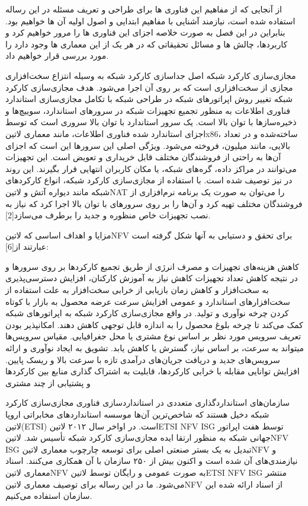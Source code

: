 \documentclass{book}
\begin{document}
از آنجایی که از مفاهیم این فناوری ها برای طراحی و تعریف مسئله در این رساله استفاده شده است، نیازمند آشنایی با مفاهیم ابتدایی و اصول اولیه آن ها خواهیم بود. بنابراین در این فصل به صورت خلاصه اجزای این فناوری ها را مرور خواهیم کرد و کاربردها، چالش ها و مسائل تحقیقاتی که در هر یک از این معماری ها وجود دارد را مورد بررسی قرار خواهیم داد.

مجازی‌سازی کارکرد شبکه اصل جداسازی کارکرد شبکه به وسیله انتزاع سخت‌افزاری مجازی از سخت‌افزاری است که بر روی آن اجرا می‌شود.
هدف مجازی‌سازی کارکرد شبکه تغییر روش اپراتورهای شبکه در طراحی شبکه با تکامل مجازی‌سازی استاندارد فناوری اطلاعات به منظور تجمیع تجهیزات شبکه در سرورهای استاندارد،
سوییچ‌ها و ذخیره‌سازها با توان بالا است.
یک سرور استاندارد با توان بالا سروری است که توسط اجزای استاندارد شده فناوری اطلاعات، مانند معماری ‌لاتین{x86}، ساخته‌شده و در تعداد بالایی، مانند میلیون، فروخته می‌شود.
ویژگی اصلی این سرورها این است که اجزای آن‌ها به راحتی از فروشندگان مختلف قابل خریداری و تعویض است.
این تجهیزات می‌توانند در مراکز داده، گره‌های شبکه، یا مکان کاربران انتهایی قرار بگیرند.
این روند در  نیز توصیف شده است. با استفاده از مجازی‌سازی کارکرد شبکه، انواع کارکردهای شبکه مانند دیواره آتش و ‌لاتین{NAT} را می‌توان
به صورت یک برنامه نرم‌افزاری از فروشندگان مختلف تهیه کرد و آن‌ها را بر روی سرورهای با توان بالا اجرا کرد که نیاز به نصب تجهیزات خاص منظوره و جدید را برطرف می‌سازد[2].

مزایا و اهداف اساسی که ‌لاتین{NFV} برای تحقق و دست‍یابی به آن‍ها شکل گرفته است عبارتند از[6]:

 کاهش هزینه‌های تجهیزات و مصرف انرژی از طریق تجمیع کارکردها بر روی سرورها و در نتیجه کاهش تعداد تجهیزات
 کاهش نیاز به آموزش کارکنان، افزایش دسترسی‌پذیری به سخت‌افزار و کاهش زمان بازیابی از خرابی سخت‌افزار به علت استفاده از سخت‌افزارهای استاندارد و عمومی
 افزایش سرعت عرضه محصول به بازار با کوتاه کردن چرخه نوآوری و تولید. در واقع مجازی‌سازی کارکرد شبکه به اپراتورهای شبکه کمک می‌کند تا چرخه بلوغ محصول را به اندازه قابل توجهی کاهش دهند.
 امکان‍پذیر بودن تعریف سرویس مورد نظر بر اساس نوع مشتری یا محل جغرافیایی. مقیاس سرویس‌ها می‍تواند به سرعت، بر اساس نیاز، گسترش یا کاهش یابد.
 تشویق به ایجاد نوآوری و ارائه سرویس‌های جدید و دریافت جریان‌های درآمدی تازه با سرعت بالا و ریسک پایین.
 افزایش توانایی مقابله با خرابی کارکردها، قابلیت به اشتراک گذاری منابع بین کارکردها و پشتیابی از چند مشتری

سازمان‌های استانداردگذاری متعددی در استانداردسازی فناوری مجازی‌سازی کارکرد شبکه دخیل هستند که شاخص‌ترین آن‌ها موسسه استانداردهای مخابراتی اروپا ‌لاتین{(ETSI)} است.
در اواخر سال ۲۰۱۲ ‌لاتین{ETSI NFV ISG} توسط هفت اپراتور جهانی شبکه به منظور ارتقا ایده مجازی‌سازی کارکرد شبکه تأسیس شد.
‌لاتین{NFV ISG} تبدیل به یک بستر صنعتی اصلی برای توسعه چارچوب معماری ‌لاتین{NFV} و نیازمندی‌های آن شده است
و اکنون بیش از ۲۵۰ سازمان با آن همکاری می‌کنند. اسناد معماری ‌لاتین{NFV} به صورت عمومی و رایگان توسط ‌لاتین{ETSI NFV ISG} منتشر می‌شود.
ما در این رساله برای توصیف معماری ‌لاتین{NFV} از اسناد ارائه شده این سازمان استفاده می‌کنیم.
\end{document}
